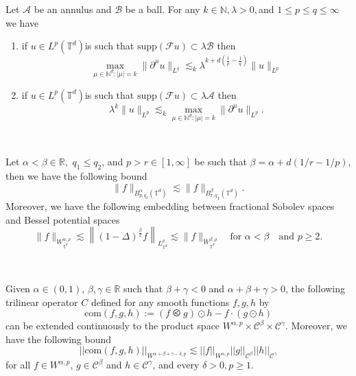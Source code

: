 \begin{lem}
  \label{lem:bernstein} Let $\mathcal{A}$ be an annulus and $\mathcal{B}$ be a
  ball. For any $k \in \mathbb{N}, \lambda > 0,$and $1 \leqslant p \leqslant q
  \leqslant \infty$ we have
  \begin{enumerate}
    \item if $u \in L^p (\mathbb{T}^d) $is such that $\mathrm{supp}
    (\mathcal{F}u) \subset \lambda \mathcal{B}$ then
    \[ \underset{\mu \in \mathbb{N}^d : | \mu | = k}{\max} \| \partial^{\mu} u
       \|_{L^q} \lesssim_k \lambda^{k + d \left( \frac{1}{p} - \frac{1}{q}
       \right)} \| u \|_{L^p} \]
    \item if $u \in L^p (\mathbb{T}^d) $is such that $\mathrm{supp}
    (\mathcal{F}u) \subset \lambda \mathcal{A}$ then
    \[ \lambda^k \| u \|_{L^p} \lesssim_k \underset{\mu \in \mathbb{N}^d : |
       \mu | = k}{\max} \| \partial^{\mu} u \|_{L^p} . \]
  \end{enumerate}
\end{lem}

\

\begin{lem}
  \label{lem:besovem} Let $\alpha < \beta \in \mathbb{R}, $ $q_1 \leqslant
  q_2$, and $p > r \in [1, \infty]$ be such that $\beta = \alpha + d (1 / r -
  1 / p)$, then we have the following bound
  \[ \| f \|_{B_{p, q_2}^{\alpha} (\mathbb{T}^d)} \lesssim \| f \|_{{B_{r,
     q}^{\beta}}_1 (\mathbb{T}^d)} . \]
  Moreover, we have the following embedding between fractional Sobolev spaces
  and Bessel potential spaces
  \begin{equation}
    \| f \|_{W_{\mathbb{T}^d}^{\alpha, \rho}} \lesssim \left\| (1 -
    \Delta)^{\frac{\beta}{2}} f \right\|_{L_{\mathbb{T}^d}^{\rho}} \lesssim \|
    f \|_{W_{\mathbb{T}^d}^{\beta, \rho}} \quad \text{for } \alpha < \beta
    \quad \text{and } p \geqslant 2. \label{ineq:Bessel}
  \end{equation}
\end{lem}

\

\begin{prop}
  \label{prop:commu}
  
  Given $\alpha \in (0, 1)$, $\beta, \gamma \in \mathbb{R}$ such that $\beta +
  \gamma < 0$ and $\alpha + \beta + \gamma > 0$, the following trilinear
  operator $C$ defined for any smooth functions $f, g, h$ by
  \[ \mathrm{com} (f, g, h) := (f \olessthan g) \odot h - f \cdot (g \odot
     h) \]
  can be extended continuously to the product space $W^{\alpha, p} \times
  \mathcal{C}^{\beta} \times \mathcal{C}^{\gamma}$. Moreover, we have the
  following bound
  \[ || \mathrm{com} (f, g, h) ||_{W^{\alpha + \beta + \gamma - \delta, p}}
     \lesssim || f ||_{W^{\alpha, p}} || g ||_{\mathcal{C}^{\beta}} || h
     ||_{\mathcal{C}^{\gamma}} \]
  for all $f \in W^{\alpha, p}$, $g \in \mathcal{C}^{\beta}$ and $h \in
  \mathcal{C}^{\gamma}$, and every $\delta > 0, p \geqslant 1$.
\end{prop}

